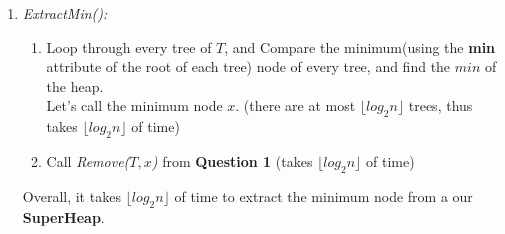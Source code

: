 \documentclass[10pt]{article}
\begin{document}
\begin{enumerate}
\begin{enumerate}
\item \textit{ExtractMin():}
\begin{enumerate}
\item Loop through every tree of $T$, and Compare the minimum(using the \textbf{min} attribute of the root of each tree) node of every tree, and find the $min$ of the heap. \\Let's call the minimum node $x$. \null\hfill (there are at most $\lfloor log_2n \rfloor$ trees, thus takes $\lfloor log_2n \rfloor$ of time)
\item Call \textit{Remove($T, x$)} from \textbf{Question 1} \null\hfill (takes $\lfloor log_2n \rfloor$ of time)
\end{enumerate}
Overall, it takes $\lfloor log_2n \rfloor$ of time to extract the minimum node from a our \textbf{SuperHeap}.
\end{enumerate}
\end{enumerate}
\end{document}
